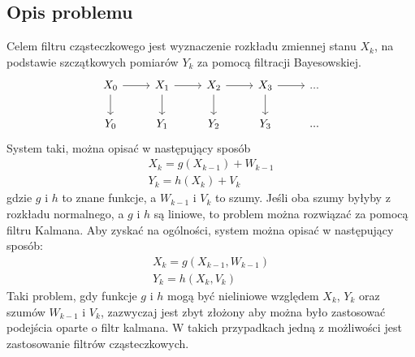 \documentclass[10pt,a4paper]{article}
\begin{document}
\subsection{Opis problemu}
Celem filtru cząsteczkowego jest wyznaczenie rozkładu zmiennej stanu $X_k$, na podstawie szczątkowych pomiarów $Y_k$ za pomocą filtracji Bayesowskiej. \\
\begin{equation*}
\begin{tikzcd}
	X_0 \arrow{r} \arrow{d} &X_1 \arrow{r} \arrow{d} &X_2 \arrow{r} \arrow{d} &X_3\arrow{r} \arrow{d} &...\\
	Y_0 &Y_1 &Y_2 &Y_3 &...
\end{tikzcd} 
\end{equation*}
System taki, można opisać w następujący sposób
\begin{equation*}
	\begin{aligned}
		X_k=g(X_{k-1})+W_{k-1} \\
		Y_k=h(X_k)+V_k
	\end{aligned}
\end{equation*}
gdzie $g$ i $h$ to znane funkcje, a $W_{k-1}$ i $V_k$ to szumy. Jeśli oba szumy byłyby z rozkładu normalnego, a $g$ i $h$ są liniowe, to problem można rozwiązać za pomocą filtru Kalmana. Aby zyskać na ogólności, system można opisać w następujący sposób:
\begin{equation}
	\begin{aligned}
		X_k=g(X_{k-1}, W_{k-1}) \\
		Y_k=h(X_k, V_k)
	\end{aligned}
\end{equation}
Taki problem, gdy funkcje $g$ i $h$ mogą być nieliniowe względem $X_k$, $Y_k$ oraz szumów $W_{k-1}$ i $V_k$, zazwyczaj jest zbyt złożony aby można było zastosować podejścia oparte o filtr kalmana. W takich przypadkach jedną z możliwości jest zastosowanie filtrów cząsteczkowych.
\end{document}
